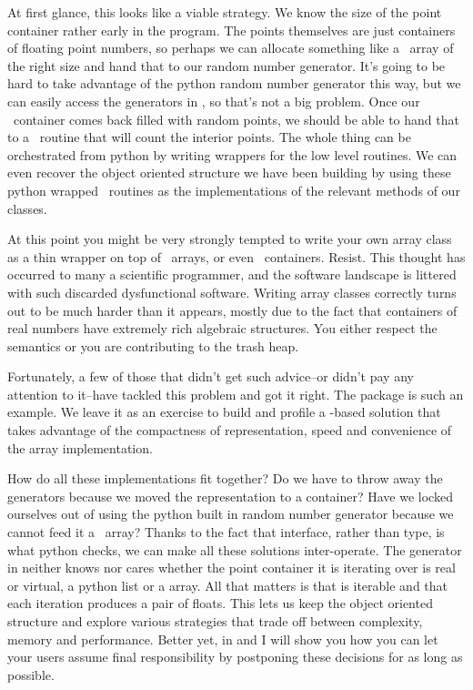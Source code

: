 At first glance, this looks like a viable strategy. We know the size of the point container
rather early in the program. The points themselves are just containers of floating point
numbers, so perhaps we can allocate something like a \cc\ array of the right size and hand that
to our random number generator. It's going to be hard to take advantage of the python random
number generator this way, but we can easily access the generators in , so that's
not a big problem. Once our \cc\ container comes back filled with random points, we should be
able to hand that to a \cc\ routine that will count the interior points. The whole thing can be
orchestrated from python by writing wrappers for the low level routines. We can even recover
the object oriented structure we have been building by using these python wrapped \cc\ routines
as the implementations of the relevant methods of our classes.

At this point you might be very strongly tempted to write your own array class as a thin
wrapper on top of \cc\ arrays, or even \cpp\ containers. Resist. This thought has occurred to
many a scientific programmer, and the software landscape is littered with such discarded
dysfunctional software. Writing array classes correctly turns out to be much harder than it
appears, mostly due to the fact that containers of real numbers have extremely rich algebraic
structures. You either respect the semantics or you are contributing to the trash heap.

Fortunately, a few of those that didn't get such advice--or didn't pay any attention to
it--have tackled this problem and got it right. The package \supercite{numpy}
is such an example. We leave it as an exercise to build and profile a -based
solution that takes advantage of the compactness of representation, speed and convenience of
the array implementation.

How do all these implementations fit together? Do we have to throw away the generators because
we moved the representation to a  container? Have we locked ourselves out of
using the python built in random number generator because we cannot feed it a \cc\ array?
Thanks to the fact that interface, rather than type, is what python checks, we can make all
these solutions inter-operate. The generator  in
 neither knows nor cares whether the point container it is
iterating over is real or virtual, a python list or a  array. All that
matters is that  is iterable and that each iteration produces a pair of
floats. This lets us keep the object oriented structure and explore various strategies that
trade off between complexity, memory and performance. Better yet, in  and
 I will show you how you can let your users assume final responsibility by
postponing these decisions for as long as possible.

